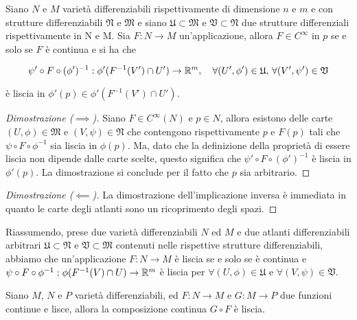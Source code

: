 \begin{definition}
	Siano $ N $ e $ M $ varietà differenziabili rispettivamente di dimensione  $ n $ e $ m $ e con strutture differenziabili $ \mathfrak{N} $ e $ \mathfrak{M} $ e siano $ \mathfrak{U} \subset \mathfrak{M} $ e $ \mathfrak{V} \subset \mathfrak{N} $ due strutture differenziali rispettivamente in N e M. Sia $ F : N \to M $ un'applicazione, allora $ F \in C^{\infty} $ in $ p $ se e solo se $ F $ è continua e si ha che
	
	\begin{equation}
		\psi' \circ F \circ (\phi')^{-1} : \phi'(F^{-1}(V') \cap U') \to \R^{m} \qcomma \forall (U',\phi') \in \mathfrak{U}, \, \forall (V',\psi') \in \mathfrak{V}
	\end{equation}

	è liscia in $ \phi'(p) \in \phi'(F^{-1}(V') \cap U') $.
\end{definition}

\begin{proof}[Dimostrazione ($ \implies $)]
	Siano $ F \in C^{\infty}(N) $ e $ p \in N $, allora esistono delle carte $ (U,\phi) \in \mathfrak{M} $ e $ (V,\psi) \in \mathfrak{N} $ che contengono rispettivamente $ p $ e $ F(p) $ tali che $ \psi \circ F \circ \phi^{-1} $ sia liscia in $ \phi(p) $. Ma, dato che la definizione della proprietà di essere liscia non dipende dalle carte scelte, questo significa che $ \psi' \circ F \circ (\phi')^{-1} $ è liscia in $ \phi'(p) $. La dimostrazione si conclude per il fatto che $ p $ sia arbitrario.
\end{proof}

\begin{proof}[Dimostrazione ($ \impliedby $)]
	La dimostrazione dell'implicazione inversa è immediata in quanto le carte degli atlanti sono un ricoprimento degli spazi.
\end{proof}

Riassumendo, prese due varietà differenziabili $ N $ ed $ M $ e due atlanti differenziabili arbitrari $ \mathfrak{U} \subset \mathfrak{N} $ e $ \mathfrak{V} \subset \mathfrak{M} $ contenuti nelle rispettive strutture differenziabili, abbiamo che un'applicazione $ F : N \to M $ è liscia se e solo se è continua e $ \psi \circ F \circ \phi^{-1} : \phi(F^{-1}(V) \cap U) \to \mathbb{R}^{m} $ è liscia per $ \forall (U,\phi) \in \mathfrak{U} $ e $ \forall (V,\psi) \in \mathfrak{V} $.

\begin{definition}
	Siano $ M $, $ N $ e $ P $ varietà differenziabili, ed $ F : N \to M $ e $ G : M \to P $ due funzioni continue e lisce, allora la composizione continua $ G \circ F $ è liscia.
\end{definition}

